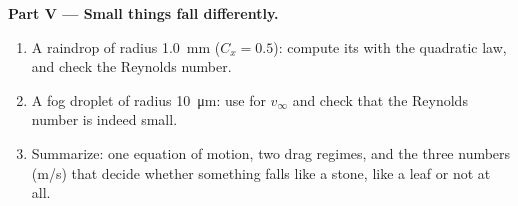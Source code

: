 \begin{problem}
\medskip
\noindent\textbf{Part V --- Small things fall differently.}
\begin{enumerate}[resume]
  \item A raindrop of radius \qty{1.0}{mm} ($C_x = 0.5$): compute its
         with the quadratic law, and check the Reynolds
        number.
  \item A fog droplet of radius \qty{10}{\micro m}: use 
        for $v_\infty$ and check that the Reynolds number is indeed
        small.
  \item Summarize: one equation of motion, two drag regimes, and the
        three numbers (\unit{m/s}) that decide whether something falls
        like a stone, like a leaf or not at all.
\end{enumerate}
\end{problem}
